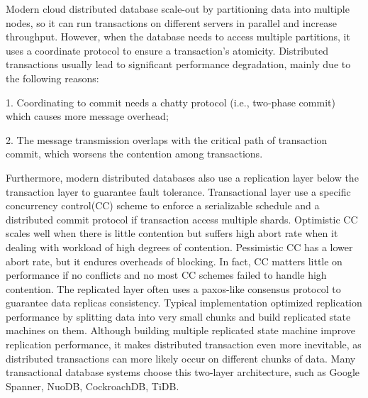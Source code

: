 \documentclass[conference]{IEEEtran}
\begin{document}
Modern cloud distributed database scale-out by partitioning data into multiple nodes, so it can run transactions on different servers in parallel and increase throughput.
However, when the database needs to access multiple partitions, it uses a coordinate protocol to ensure a transaction's atomicity.
Distributed transactions usually lead to significant performance degradation, mainly due to the following reasons\cite{Calvin:conf/sigmod/ThomsonDWRSA12}:

1. Coordinating to commit needs a chatty protocol (i.e., two-phase commit) which causes more message overhead;

2. The message transmission overlaps with the critical path of transaction commit, which worsens the contention among transactions.

Furthermore, modern distributed databases also use a replication layer below the transaction layer to guarantee fault tolerance.
Transactional layer use a specific concurrency control(CC) scheme to enforce a serializable schedule and a distributed commit protocol if transaction access multiple shards.
Optimistic CC scales well when there is little contention but suffers high abort rate when it dealing with workload of high degrees of contention.
Pessimistic CC has a lower abort rate, but it endures overheads of blocking.
In fact, CC matters little on performance if no conflicts and no most CC schemes failed to handle high contention\cite{PerformanceOfCC:conf/vldb/CareyS84}\cite{EvaluationOfCC:journals/pvldb/HardingAPS17}.
The replicated layer often uses a paxos-like consensus protocol to guarantee data replicas consistency.
Typical implementation optimized replication performance by splitting data into very small chunks and build replicated state machines on them.
Although building multiple replicated state machine improve replication performance, it makes distributed transaction even more inevitable,
as distributed transactions can more likely occur on different chunks of data.
Many transactional database systems choose this two-layer architecture, such as Google Spanner\cite{Spanner:conf/osdi/CorbettDEFFFGGHHHKKLLMMNQRRSSTWW12}\cite{Spanner:conf/sigmod/BaconBBCDFFGJKL17}, NuoDB\cite{NuoDB}, CockroachDB\cite{CockroachDB}, TiDB\cite{TiDB}.
\end{document}
